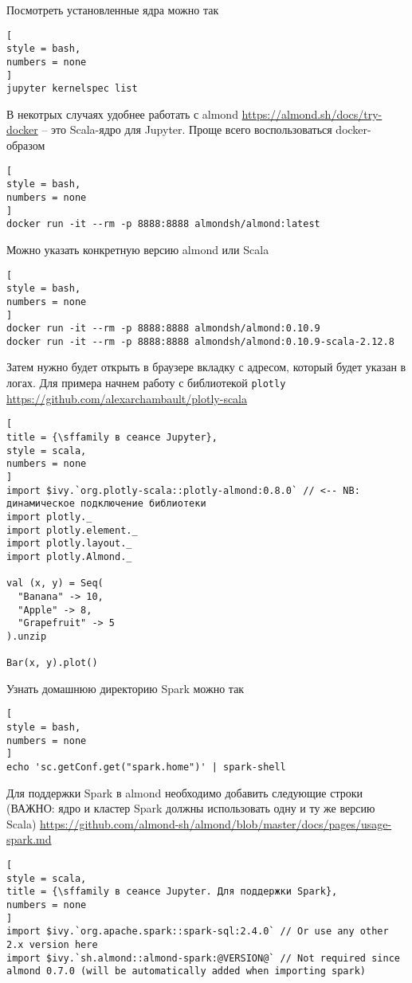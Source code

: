 \documentclass[%
	11pt,
	a4paper,
	utf8,
		]{article}
\begin{document}
Посмотреть установленные ядра можно так
\begin{lstlisting}[
style = bash,
numbers = none	
]
jupyter kernelspec list
\end{lstlisting}

В некотрых случаях удобнее работать с almond \url{https://almond.sh/docs/try-docker} -- это Scala-ядро для Jupyter. Проще всего воспользоваться docker-образом
\begin{lstlisting}[
style = bash,
numbers = none	
]
docker run -it --rm -p 8888:8888 almondsh/almond:latest
\end{lstlisting}

Можно указать конкретную версию almond или Scala
\begin{lstlisting}[
style = bash,
numbers = none	
]
docker run -it --rm -p 8888:8888 almondsh/almond:0.10.9
docker run -it --rm -p 8888:8888 almondsh/almond:0.10.9-scala-2.12.8
\end{lstlisting}

Затем нужно будет открыть в браузере вкладку с адресом, который будет указан в логах. Для примера начнем работу с библиотекой \texttt{plotly} \url{https://github.com/alexarchambault/plotly-scala}
\begin{lstlisting}[
title = {\sffamily в сеансе Jupyter},
style = scala,
numbers = none	
]
import $ivy.`org.plotly-scala::plotly-almond:0.8.0` // <-- NB: динамическое подключение библиотеки
import plotly._
import plotly.element._
import plotly.layout._
import plotly.Almond._

val (x, y) = Seq(
  "Banana" -> 10,
  "Apple" -> 8,
  "Grapefruit" -> 5
).unzip

Bar(x, y).plot()
\end{lstlisting}

Узнать домашнюю директорию Spark можно так
\begin{lstlisting}[
style = bash,
numbers = none	
]
echo 'sc.getConf.get("spark.home")' | spark-shell
\end{lstlisting}

Для поддержки Spark в almond необходимо добавить следующие строки (ВАЖНО: ядро и кластер Spark должны использовать одну и ту же версию Scala) \url{https://github.com/almond-sh/almond/blob/master/docs/pages/usage-spark.md}
\begin{lstlisting}[
style = scala,
title = {\sffamily в сеансе Jupyter. Для поддержки Spark},
numbers = none	
]
import $ivy.`org.apache.spark::spark-sql:2.4.0` // Or use any other 2.x version here
import $ivy.`sh.almond::almond-spark:@VERSION@` // Not required since almond 0.7.0 (will be automatically added when importing spark)
\end{lstlisting}
\end{document}
